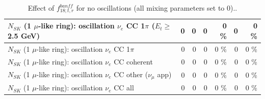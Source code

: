 \begin{table}
\begin{tabular}{| l | r | r | r  r | r  r |}
$N_{SK}$ (1 $\mu$-like ring): oscillation $\nu_e$ CC 1$\pi$ ($E_{t} \geq$ 2.5 GeV) &               0 &               0 &               0 &        0 \%  &               0 &        0 \%  \\ 
\hline
                     $N_{SK}$ (1 $\mu$-like ring): oscillation $\nu_e$ CC 1$\pi$ &               0 &               0 &               0 &        0 \%  &               0 &        0 \%  \\ 
                   $N_{SK}$ (1 $\mu$-like ring): oscillation $\nu_e$ CC coherent &               0 &               0 &               0 &        0 \%  &               0 &        0 \%  \\ 
      $N_{SK}$ (1 $\mu$-like ring): oscillation $\nu_e$ CC other ($\nu_\mu$ app) &               0 &               0 &               0 &        0 \%  &               0 &        0 \%  \\ 
                       $N_{SK}$ (1 $\mu$-like ring): oscillation $\nu_e$  CC all &               0 &               0 &               0 &        0 \%  &               0 &        0 \%  \\ 
\hline
\hline
\end{tabular}
\caption{ Effect of $f_{18; t, r}^{banff}$ for no oscillations (all mixing parameters set to 0).. }
\label{tab:num_banff_ccqeE0_1RmuT_3f_osc_t13:0}
\end{table}
\clearpage
